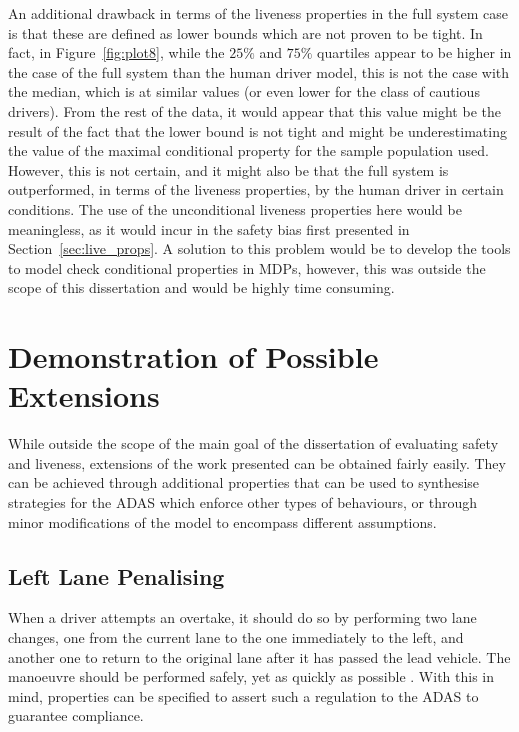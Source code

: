 An additional drawback in terms of the liveness properties in the full system case is that these are defined as lower bounds which are not proven to be tight. In fact, in Figure~\ref{fig:plot8}, while the $25\%$ and $75\%$ quartiles appear to be higher in the case of the full system than the human driver model, this is not the case with the median, which is at similar values (or even lower for the class of cautious drivers). From the rest of the data, it would appear that this value might be the result of the fact that the lower bound is not tight and might be underestimating the value of the maximal conditional property for the sample population used. However, this is not certain, and it might also be that the full system is outperformed, in terms of the liveness properties, by the human driver in certain conditions. The use of the unconditional liveness properties here would be meaningless, as it would incur in the safety bias first presented in Section~\ref{sec:live_props}. A solution to this problem would be to develop the tools to model check conditional properties in MDPs, however, this was outside the scope of this dissertation and would be highly time consuming.

\section{Demonstration of Possible Extensions}
\label{sec:add_exp}

While outside the scope of the main goal of the dissertation of evaluating safety and liveness, extensions of the work presented can be obtained fairly easily. They can be achieved through additional properties that can be used to synthesise strategies for the ADAS which enforce other types of behaviours, or through minor modifications of the model to encompass different assumptions.

\subsection{Left Lane Penalising}

When a driver attempts an overtake, it should do so by performing two lane changes, one from the current lane to the one immediately to the left, and another one to return to the original lane after it has passed the lead vehicle. The manoeuvre should be performed safely, yet as quickly as possible \cite{carr}. With this in mind, properties can be specified to assert such a regulation to the ADAS to guarantee compliance.

